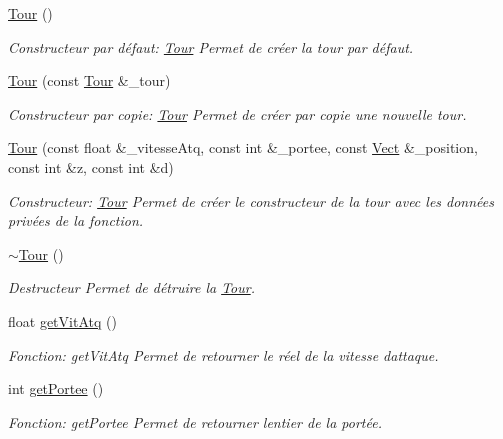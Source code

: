 \begin{DoxyCompactItemize}
\item 
\hyperlink{classTour_a85e0f0e2346d1e42a09a80c1cd6d19c4}{Tour} ()
\begin{DoxyCompactList}\small\item\em Constructeur par défaut\+: \hyperlink{classTour}{Tour} Permet de créer la tour par défaut. \end{DoxyCompactList}\item 
\hyperlink{classTour_a3e25a64c74446192ac71283e08db4e49}{Tour} (const \hyperlink{classTour}{Tour} \&\+\_\+tour)
\begin{DoxyCompactList}\small\item\em Constructeur par copie\+: \hyperlink{classTour}{Tour} Permet de créer par copie une nouvelle tour. \end{DoxyCompactList}\item 
\hyperlink{classTour_abb21d80605aacb220f1ab7ac92119ce4}{Tour} (const float \&\+\_\+vitesse\+Atq, const int \&\+\_\+portee, const \hyperlink{classVect}{Vect} \&\+\_\+position, const int \&z, const int \&d)
\begin{DoxyCompactList}\small\item\em Constructeur\+: \hyperlink{classTour}{Tour} Permet de créer le constructeur de la tour avec les données privées de la fonction. \end{DoxyCompactList}\item 
\mbox{\label{classTour_a6d692d4b1a687bf34f6b38828d86512e}} 
\hyperlink{classTour_a6d692d4b1a687bf34f6b38828d86512e}{$\sim$\+Tour} ()
\begin{DoxyCompactList}\small\item\em Destructeur Permet de détruire la \hyperlink{classTour}{Tour}. \end{DoxyCompactList}\item 
float \hyperlink{classTour_a41fc157f749f571732100fa0daa1ad25}{get\+Vit\+Atq} ()
\begin{DoxyCompactList}\small\item\em Fonction\+: get\+Vit\+Atq Permet de retourner le réel de la vitesse d\textquotesingle{}attaque. \end{DoxyCompactList}\item 
int \hyperlink{classTour_a4c0b40ef85678f12cc7a3e78588094e8}{get\+Portee} ()
\begin{DoxyCompactList}\small\item\em Fonction\+: get\+Portee Permet de retourner l\textquotesingle{}entier de la portée. \end{DoxyCompactList}\item 

\end{DoxyCompactItemize}
